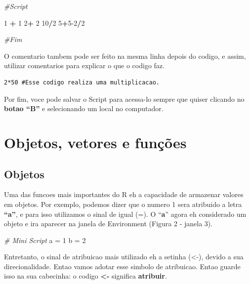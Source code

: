 \documentclass[
]{book}
\newenvironment{Shaded}{\begin{snugshade}}{\end{snugshade}}
\newcommand{\CommentTok}[1]{\textcolor[rgb]{0.56,0.35,0.01}{\textit{#1}}}
\newcommand{\DecValTok}[1]{\textcolor[rgb]{0.00,0.00,0.81}{#1}}
\newcommand{\NormalTok}[1]{#1}
\newcommand{\OtherTok}[1]{\textcolor[rgb]{0.56,0.35,0.01}{#1}}
\newcommand{\SpecialCharTok}[1]{\textcolor[rgb]{0.81,0.36,0.00}{\textbf{#1}}}
\begin{document}
\begin{Shaded}
\begin{Highlighting}[]
\CommentTok{\#Script}

\DecValTok{1} \SpecialCharTok{+} \DecValTok{1}
\DecValTok{2}\SpecialCharTok{+} \DecValTok{2}
\DecValTok{10}\SpecialCharTok{/}\DecValTok{2}
\DecValTok{5}\SpecialCharTok{+}\DecValTok{5{-}2}\SpecialCharTok{/}\DecValTok{2}

\CommentTok{\#Fim}
\end{Highlighting}
\end{Shaded}

O comentario tambem pode ser feito na mesma linha depois do codigo, e assim, utilizar comentarios para explicar o que o codigo faz.

\begin{verbatim}
2*50 #Esse codigo realiza uma multiplicacao.
\end{verbatim}

Por fim, voce pode salvar o Script para acessa-lo sempre que quiser clicando no \textbf{botao ``B''} e selecionando um local no computador.

\hypertarget{objetos-vetores-e-funuxe7uxf5es}{%
\section{Objetos, vetores e funções}\label{objetos-vetores-e-funuxe7uxf5es}}

\hypertarget{objetos}{%
\subsection{Objetos}\label{objetos}}

Uma das funcoes mais importantes do R eh a capacidade de armazenar valores em objetos. Por exemplo, podemos dizer que o numero 1 sera atribuido a letra \textbf{``a''}, e para isso utilizamos o sinal de igual (=). O ``\textbf{a}'' agora eh considerado um objeto e ira aparecer na janela de Environment (Figura 2 - janela 3).

\begin{Shaded}
\begin{Highlighting}[]
\CommentTok{\# Mini Script  }
\NormalTok{a }\OtherTok{=} \DecValTok{1}  
\NormalTok{b }\OtherTok{=} \DecValTok{2}  
\end{Highlighting}
\end{Shaded}

Entretanto, o sinal de atribuicao mais utilizado eh a setinha (\textless-), devido a sua direcionalidade. Entao vamos adotar esse simbolo de atribuicao. Entao guarde isso na sua cabecinha: o codigo \textbf{\textless-} significa \textbf{atribuir}.
\end{document}

